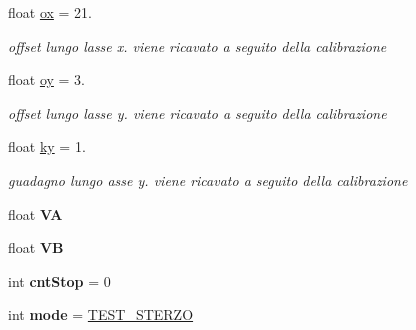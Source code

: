 \begin{DoxyCompactItemize}
float \mbox{\hyperlink{ari_pi__2_d_c__esp__08_8ino_ab9355e95cf7b931e4ac76a90c7b163c6}{ox}} = 21.
\begin{DoxyCompactList}\small\item\em offset lungo l\textquotesingle{}asse x. viene ricavato a seguito della calibrazione \end{DoxyCompactList}\item 
\mbox{\label{ari_pi__2_d_c__esp__08_8ino_a751717b9e3018eb4938a31fba5e636af}} 
float \mbox{\hyperlink{ari_pi__2_d_c__esp__08_8ino_a751717b9e3018eb4938a31fba5e636af}{oy}} = 3.
\begin{DoxyCompactList}\small\item\em offset lungo l\textquotesingle{}asse y. viene ricavato a seguito della calibrazione \end{DoxyCompactList}\item 
\mbox{\label{ari_pi__2_d_c__esp__08_8ino_a707bc08df1e702c248d1a2225fefc1ce}} 
float \mbox{\hyperlink{ari_pi__2_d_c__esp__08_8ino_a707bc08df1e702c248d1a2225fefc1ce}{ky}} = 1.
\begin{DoxyCompactList}\small\item\em guadagno lungo asse y. viene ricavato a seguito della calibrazione \end{DoxyCompactList}\item 
\mbox{\label{ari_pi__2_d_c__esp__08_8ino_a20aa2804cc392e162754639d1ec564d4}} 
float {\bfseries VA}
\item 
\mbox{\label{ari_pi__2_d_c__esp__08_8ino_a46393dabfdc8b3c70d5811eadaedeaf4}} 
float {\bfseries VB}
\item 
\mbox{\label{ari_pi__2_d_c__esp__08_8ino_a095b3da49a4477973982187eae80f87b}} 
int {\bfseries cnt\+Stop} = 0
\item 
\mbox{\label{ari_pi__2_d_c__esp__08_8ino_a1ea5d0cb93f22f7d0fdf804bd68c3326}} 
int {\bfseries mode} = \mbox{\hyperlink{ari_pi__2_d_c__esp__08_8ino_a3e6a2d7b0da74a50b9fd5b16aace4414}{T\+E\+S\+T\+\_\+\+S\+T\+E\+R\+ZO}}
\item 
\mbox{\label{ari_pi__2_d_c__esp__08_8ino_ae2c1c9186b3f289530624f44f4e698d7}} 

\end{DoxyCompactItemize}
